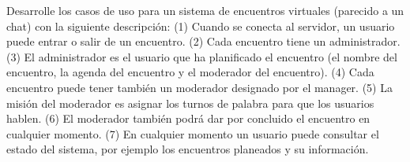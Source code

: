 Desarrolle los casos de uso para un sistema de encuentros virtuales (parecido a un chat) con la siguiente descripción: (1) Cuando se conecta al servidor, un usuario puede entrar o salir de un encuentro. (2) Cada encuentro tiene un administrador. (3) El administrador es el usuario que ha planificado el encuentro (el nombre del encuentro, la agenda del encuentro y el moderador del encuentro). (4) Cada encuentro puede tener también un moderador designado por el manager. (5) La misión del moderador es asignar los turnos de palabra para que los usuarios hablen. (6) El moderador también podrá dar por concluido el encuentro en cualquier momento. (7) En cualquier momento un usuario puede consultar el estado del sistema, por ejemplo los encuentros planeados y su información.

